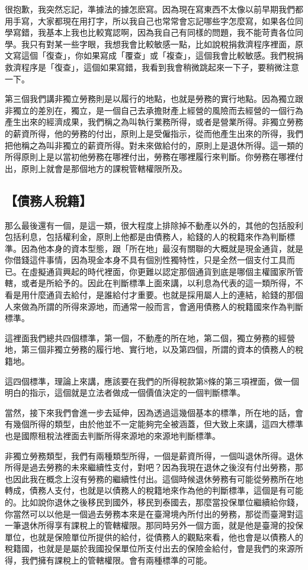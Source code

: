 \documentclass[]{ctexbook}
\begin{document}
很抱歉，我突然忘記，準據法的據怎麽寫。因為現在寫東西不太像以前早期我們都用手寫，大家都現在用打字，所以我自己也常常會忘記哪些字怎麼寫，如果各位同學寫錯，我基本上我也比較寬認啊，因為我自己有同樣的問題，我不能苛責各位同學。我只有對某一些字眼，我想我會比較敏感一點，比如說稅捐救濟程序裡面，原文寫這個「復查」，你如果寫成「覆查」或「複查」，這個我會比較敏感。我們稅捐救濟程序是「復查」，這個如果寫錯，我看到我會稍微跳起來一下子，要稍微注意一下。

第三個我們講非獨立勞務則是以履行的地點，也就是勞務的實行地點。因為獨立跟非獨立的差別在，獨立，是一個自己去承擔財產上經營的風險而去經營的一個行為產生出來的經濟成果，我們稱之為叫執行業務所得，或者是營業所得。非獨立勞務的薪資所得，他的勞務的付出，原則上是受僱指示，從而他產生出來的所得，我們把他稱之為叫非獨立的薪資所得。對未來做給付的，原則上是退休所得。這一類的所得原則上是以當初他勞務在哪裡付出，勞務在哪裡履行來判斷。你勞務在哪裡付出，原則上就會是那個地方的課稅管轄權限所及。

\hypertarget{ux50b5ux52d9ux4ebaux7a05ux7c4d}{%
\subsection{【債務人稅籍】}\label{ux50b5ux52d9ux4ebaux7a05ux7c4d}}

那么最後還有一個，是這一類，很大程度上排除掉不動產以外的，其他的包括股利包括利息，包括權利金，原則上他都是由債務人，給錢的人的稅籍來作為判斷標準。因為他本身的資本型態，跟「所在地」最沒有關聯的大概就是現金通貨，就是你借錢這件事情，因為現金本身不具有個別性獨特性，只是全然一個支付工具而已。在虛擬通貨興起的時代裡面，你更難以認定那個通貨到底是哪個主權國家所管轄，或者是所給予的。因此在判斷標準上面來講，以利息為代表的這一類所得，不看是用什麼通貨去給付，是誰給付才重要。也就是採用屬人上的連結，給錢的那個人來做為所謂的所得來源地，而通常一般而言，會適用債務人的稅籍國來作為判斷標準。

這裡面我們總共四個標準，第一個，不動產的所在地，第二個，獨立勞務的經營地，第三個非獨立勞務的履行地、實行地，以及第四個，所謂的資本的債務人的稅籍地。

這四個標準，理論上來講，應該要在我們的所得稅款第8條的第三項裡面，做一個明白的指示，這個就是立法者做成一個價值決定的一個判斷標準。

當然，接下來我們會進一步去延伸，因為透過這幾個基本的標準，所在地的話，會有幾個所得的類型，由於他並不一定能夠完全被涵蓋，但大致上來講，這四大標準也是國際租稅法裡面去判斷所得來源地的來源地判斷標準。

非獨立勞務類型，我們有兩種類型所得，一個是薪資所得，一個叫退休所得。退休所得是過去勞務的未來繼續性支付，對吧？因為我現在退休之後沒有付出勞務，那也因此我在概念上沒有勞務的繼續性付出。這個時候退休勞務有可能從勞務所在地轉成，債務人支付，也就是以債務人的稅籍地來作為他的判斷標準，這個是有可能的。比如說你退休之後移民到國外，移民到泰國去，那麼當投保單位繼續給你錢，你當然可以以他是一個過去勞務本來是在臺灣境內所付出的勞務，那從而臺灣對這一筆退休所得享有課稅上的管轄權限。那同時另外一個方面，就是他是臺灣的投保單位，也就是保險單位所提供的給付，從債務人的觀點來看，他也會是以債務人的稅籍國，也就是是屬於我國投保單位所支付出去的保險金給付，會是我們的來源所得，我們擁有課稅上的管轄權限。會有兩種標準的可能。
\end{document}
